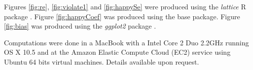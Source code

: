 Figures \ref{fig:re}, \ref{fig:violate1} and \ref{fig:happySe} were produced using the \emph{lattice} R package \citep{Sarkar:2007}. Figure \ref{fig:happyCoef} was produced  using the base package.   Figure \ref{fig:bias} was produced using the \emph{ggplot2} package \citep{wickham:2008b}.

Computations were done in a MacBook with a Intel Core 2 Duo 2.2GHz running OS X 10.5 and at the Amazon Elastic Compute Cloud (EC2) service using Ubuntu 64 bits virtual machines. Details available upon request.

%
% 
% 

